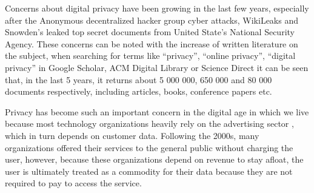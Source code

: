 Concerns about digital privacy have been growing \cite{emami2019exploring, park2022personal, zhang2022peer}
in the last few years, especially after the Anonymous decentralized hacker
group cyber attacks, WikiLeaks and Snowden's leaked top secret documents
from United State's National Security Agency. These concerns can be noted
with the increase of written literature on the subject, when searching for
terms like ``privacy'', ``online privacy'', ``digital privacy'' in Google
Scholar, ACM Digital Library or Science Direct it can be seen that, in the
last 5 years, it returns about 5 000 000, 650 000 and 80 000 documents respectively,
including articles, books, conference papers etc.

Privacy has become such an important concern in the digital age in which
we live because most technology organizations heavily rely on
the advertising sector \cite{duan2022pricing}, which in turn depends on customer
data. Following the
2000s, many organizations offered their services to the general public without
charging the user, however, because these organizations depend on revenue to
stay afloat, the user is ultimately treated as a commodity for their data
because they are not required to pay to access the service.

